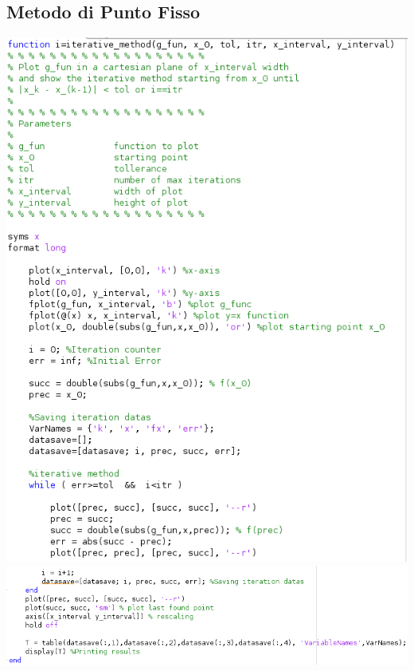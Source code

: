 \documentclass[12pt, letterpaper]{article}
\begin{document}
\subsection{Metodo di Punto Fisso}
\includegraphics[scale=0.83]{ProgrammaPuntoFisso1.png}\\
\includegraphics[scale=0.83]{ProgrammaPuntoFisso2.png}
\newpage
\end{document}
